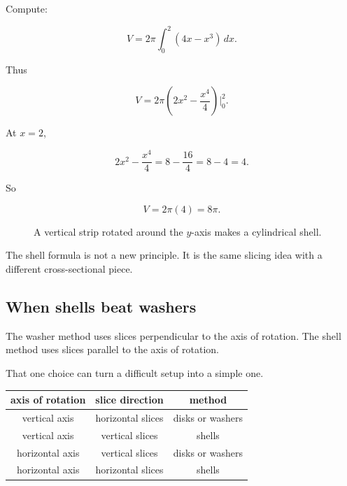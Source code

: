 Compute:

\[
V
=
2\pi\int_0^2 (4x-x^3)\,dx.
\]

Thus

\[
V
=
2\pi\left(2x^2-\frac{x^4}{4}\right)\Big|_0^2.
\]

At \(x=2\),

\[
2x^2-\frac{x^4}{4}
=
8-\frac{16}{4}
=
8-4
=
4.
\]

So

\[
V=2\pi(4)=\boxed{8\pi}.
\]

\begin{figure}[h]
\centering
{}
\caption{A vertical strip rotated around the \(y\)-axis makes a cylindrical shell.}
\label{fig:shell-parabola}
\end{figure}

The shell formula is not a new principle.  It is the same slicing idea with a different
cross-sectional piece.

\subsection{When shells beat washers}
\label{subsec:when-shells-beat-washers}

The washer method uses slices perpendicular to the axis of rotation.  The shell method
uses slices parallel to the axis of rotation.

That one choice can turn a difficult setup into a simple one.

\begin{center}
\begin{tabular}{c|c|c}
\textbf{axis of rotation} & \textbf{slice direction} & \textbf{method} \\ \hline
vertical axis & horizontal slices & disks or washers \\
vertical axis & vertical slices & shells \\
horizontal axis & vertical slices & disks or washers \\
horizontal axis & horizontal slices & shells
\end{tabular}
\end{center}

